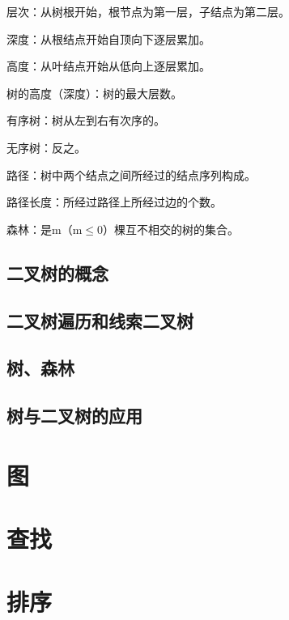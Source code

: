 \documentclass{ctexart}
\begin{document}
层次：从树根开始，根节点为第一层，子结点为第二层。

深度：从根结点开始自顶向下逐层累加。

高度：从叶结点开始从低向上逐层累加。

树的高度（深度）：树的最大层数。

有序树：树从左到右有次序的。

无序树：反之。

路径：树中两个结点之间所经过的结点序列构成。

路径长度：所经过路径上所经过边的个数。

森林：是m（m$\leq$0）棵互不相交的树的集合。

\subsection{二叉树的概念}

\subsection{二叉树遍历和线索二叉树}

\subsection{树、森林}

\subsection{树与二叉树的应用}

\section{图}

\section{查找}

\section{排序}

\subsection{}
\end{document}
